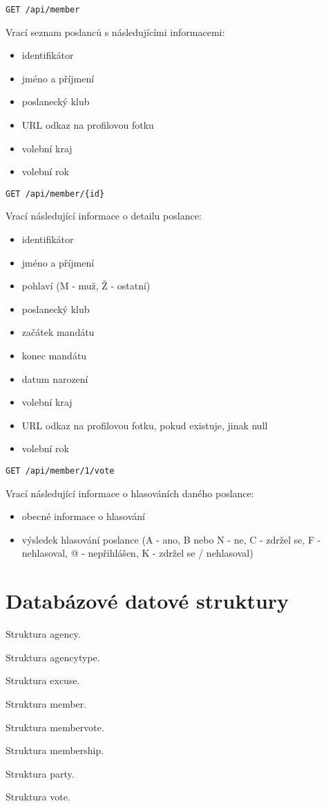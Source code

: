\vspace{10px}

\begin{lstlisting}
GET /api/member
\end{lstlisting}

\noindent Vrací seznam poslanců s následujícími informacemi:

\begin{itemize}
	\item identifikátor
	\item jméno a příjmení
	\item poslanecký klub
	\item URL odkaz na profilovou fotku
	\item volební kraj
	\item volební rok
\end{itemize}

\vspace{10px}

\begin{lstlisting}
GET /api/member/{id}
\end{lstlisting}

\noindent Vrací následující informace o detailu poslance:

\begin{itemize}
	\item identifikátor
	\item jméno a příjmení
	\item pohlaví (M - muž, Ž - ostatní)
	\item poslanecký klub
	\item začátek mandátu
	\item konec mandátu
	\item datum narození
	\item volební kraj
	\item URL odkaz na profilovou fotku, pokud existuje, jinak null
	\item volební rok
\end{itemize}

\vspace{10px}

\begin{lstlisting}
GET /api/member/1/vote
\end{lstlisting}

\noindent Vrací následující informace o hlasováních daného poslance:

\begin{itemize}
\item obecné informace o hlasování
\item výsledek hlasování poslance (A - ano, B nebo N - ne, C - zdržel se, F - nehlasoval, @ - nepřihlášen, K - zdržel se / nehlasoval)
\end{itemize}

\section{Databázové datové struktury}

Struktura agency.

Struktura agency\textunderscore type.

Struktura excuse.

Struktura member.

Struktura member\textunderscore vote.

Struktura membership.

Struktura party.

Struktura vote.